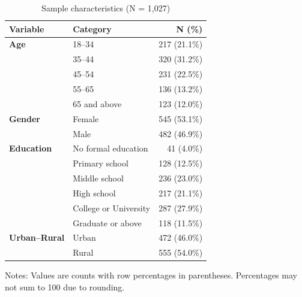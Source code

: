 \begin{table}[htbp]
\centering
\caption{Sample characteristics (N = 1,027)}
\label{tab:sample_char}
\begin{threeparttable}
\begin{tabular}{llr}
\toprule
\textbf{Variable} & \textbf{Category} & \textbf{N (\%)} \\
\midrule
\textbf{Age} & 18--34 & 217 (21.1\%) \\
             & 35--44 & 320 (31.2\%) \\
             & 45--54 & 231 (22.5\%) \\
             & 55--65 & 136 (13.2\%) \\
             & 65 and above & 123 (12.0\%) \\
\addlinespace
\textbf{Gender} & Female & 545 (53.1\%) \\
                & Male & 482 (46.9\%) \\
\addlinespace
\textbf{Education} & No formal education & 41 (4.0\%) \\
                   & Primary school & 128 (12.5\%) \\
                   & Middle school & 236 (23.0\%) \\
                   & High school & 217 (21.1\%) \\
                   & College or University & 287 (27.9\%) \\
                   & Graduate or above & 118 (11.5\%) \\
\addlinespace
\textbf{Urban--Rural} & Urban & 472 (46.0\%) \\
                      & Rural & 555 (54.0\%) \\

\bottomrule
\end{tabular}
\begin{tablenotes}[flushleft]
\footnotesize
\item Notes: Values are counts with row percentages in parentheses. Percentages may not sum to 100 due to rounding.

\end{tablenotes}
\end{threeparttable}
\end{table}
